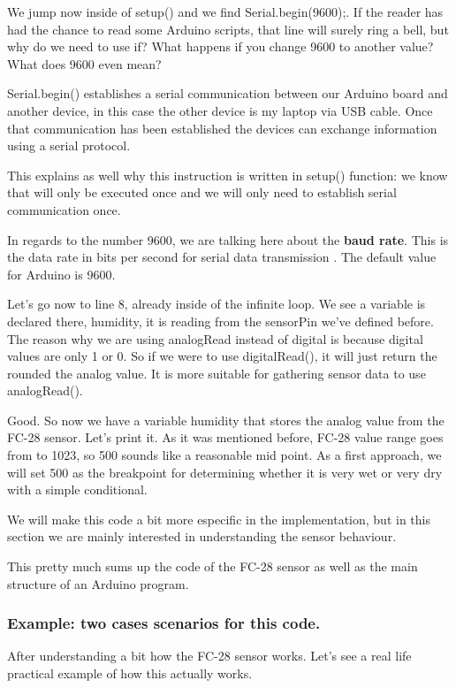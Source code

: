 We jump now inside of setup() and we find Serial.begin(9600);. If the reader has had the chance to read some Arduino scripts, that line will surely ring a bell, but why do we need to use if? What happens if you change 9600 to another value? What does 9600 even mean?

Serial.begin() establishes a serial communication between our Arduino board and another device, in this case the other device is my laptop via USB cable. Once that communication has been established the devices can exchange information using a serial protocol.

This explains as well why this instruction is written in setup() function: we know that will only be executed once and we will only need to establish serial communication once.

In regards to the number 9600, we are talking here about the \textbf{baud rate}. This is the data rate in bits per second for serial data transmission \cite{baud}. The default value for Arduino is 9600.

Let's go now to line 8, already inside of the infinite loop. We see a variable is declared there, humidity, it is reading from the sensorPin we've defined before. The reason why we are using analogRead instead of digital is because digital values are only 1 or 0. So if we were to use digitalRead(), it will just return the rounded the analog value. It is more suitable for gathering sensor data to use analogRead().

Good. So now we have a variable humidity that stores the analog value from the FC-28 sensor. Let's print it. As it was mentioned before, FC-28 value range goes from  to 1023, so 500 sounds like a reasonable mid point. As a first approach, we will set 500 as the breakpoint for determining whether it is very wet or very dry with a simple conditional.

We will make this code a bit more especific in the implementation, but in this section we are mainly interested in understanding the sensor behaviour.

This pretty much sums up the code of the FC-28 sensor as well as the main structure of an Arduino program.

\subsubsection{Example: two cases scenarios for this code.}

After understanding a bit how the FC-28 sensor works. Let's see a real life practical example of how this actually works.

